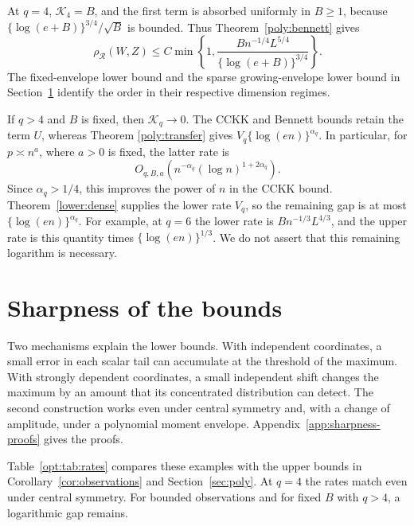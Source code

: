 \documentclass[11pt,letterpaper]{article}
\theoremstyle{remark}
\newcommand{\rh}{\rho_{\mathcal R}}
\begin{document}
At \(q=4\), \(\mathcal K_4=B\), and the first term is absorbed uniformly in
\(B\ge1\), because \(\{\log(e+B)\}^{3/4}/\sqrt B\) is bounded.
Thus Theorem~\ref{poly:bennett} gives
\begin{equation}
 \rh(W,Z)\le C\min\left\{1,
 \frac{Bn^{-1/4}L^{5/4}}{\{\log(e+B)\}^{3/4}}\right\}.
 \label{poly:q4}
\end{equation}
The fixed-envelope lower bound and the sparse growing-envelope lower
bound in Section~\ref{opt:section} identify the order in their respective
dimension regimes.

If \(q>4\) and \(B\) is fixed, then \(\mathcal K_q\to0\). The CCKK and
Bennett bounds retain the term \(U\), whereas Theorem
\ref{poly:transfer} gives \(V_q\{\log(en)\}^{\alpha_q}\). In particular, for
\(p\asymp n^a\), where \(a>0\) is fixed, the latter rate is
\[
 O_{q,B,a}\!\left(n^{-\alpha_q}(\log n)^{1+2\alpha_q}\right).
\]
Since \(\alpha_q>1/4\), this improves the power of \(n\) in the CCKK
bound. Theorem~\ref{lower:dense} supplies the lower rate \(V_q\), so
the remaining gap is at most \(\{\log(en)\}^{\alpha_q}\). For example, at
\(q=6\) the lower rate is \(Bn^{-1/3}L^{4/3}\), and the upper rate
is this quantity times \(\{\log(en)\}^{1/3}\). We do not assert that this
remaining logarithm is necessary.

\section{Sharpness of the bounds}\label{opt:section}

Two mechanisms explain the lower bounds. With independent coordinates,
a small error in each scalar tail can accumulate at the threshold of
the maximum. With strongly dependent coordinates, a small independent
shift changes the maximum by an amount that its concentrated
distribution can detect. The second construction works even under
central symmetry and, with a change of amplitude, under a polynomial
moment envelope. Appendix~\ref{app:sharpness-proofs} gives the proofs.

Table~\ref{opt:tab:rates} compares these examples with the upper bounds
in Corollary~\ref{cor:observations} and Section~\ref{sec:poly}.
At \(q=4\) the rates match even under central symmetry. For bounded
observations and for fixed \(B\) with \(q>4\), a logarithmic gap remains.
\end{document}
